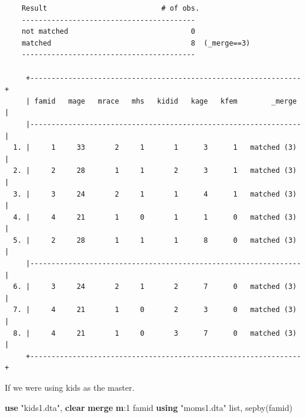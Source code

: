 \documentclass[
]{book}
\newenvironment{Shaded}{\begin{snugshade}}{\end{snugshade}}
\newcommand{\FunctionTok}[1]{\textcolor[rgb]{0.13,0.29,0.53}{\textbf{#1}}}
\newcommand{\KeywordTok}[1]{\textcolor[rgb]{0.13,0.29,0.53}{\textbf{#1}}}
\newcommand{\NormalTok}[1]{#1}
\newcommand{\OtherTok}[1]{\textcolor[rgb]{0.56,0.35,0.01}{#1}}
\newcommand{\StringTok}[1]{\textcolor[rgb]{0.31,0.60,0.02}{#1}}
\begin{document}
\begin{verbatim}
    Result                           # of obs.
    -----------------------------------------
    not matched                             0
    matched                                 8  (_merge==3)
    -----------------------------------------

     +----------------------------------------------------------------+
     | famid   mage   mrace   mhs   kidid   kage   kfem        _merge |
     |----------------------------------------------------------------|
  1. |     1     33       2     1       1      3      1   matched (3) |
  2. |     2     28       1     1       2      3      1   matched (3) |
  3. |     3     24       2     1       1      4      1   matched (3) |
  4. |     4     21       1     0       1      1      0   matched (3) |
  5. |     2     28       1     1       1      8      0   matched (3) |
     |----------------------------------------------------------------|
  6. |     3     24       2     1       2      7      0   matched (3) |
  7. |     4     21       1     0       2      3      0   matched (3) |
  8. |     4     21       1     0       3      7      0   matched (3) |
     +----------------------------------------------------------------+
\end{verbatim}

If we were using kids as the master.

\begin{Shaded}
\begin{Highlighting}[]
\KeywordTok{use} \StringTok{"kids1.dta"}\NormalTok{, }\KeywordTok{clear}
\KeywordTok{merge} \FunctionTok{m}\NormalTok{:1 famid }\KeywordTok{using} \StringTok{"moms1.dta"}
\OtherTok{list}\NormalTok{, sepby(famid)}
\end{Highlighting}
\end{Shaded}
\end{document}

